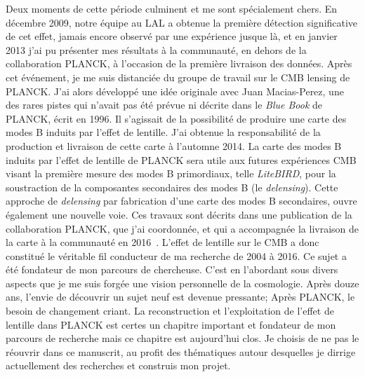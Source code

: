 \documentclass[a4paper, 12pt]{report}
\begin{document}
Deux moments de cette période culminent et me sont spécialement
chers. En décembre 2009, notre équipe au LAL a obtenue la première
détection significative de cet effet, jamais encore observé par une
expérience jusque là, et en janvier 2013 j'ai pu présenter mes
résultats à la communauté, en dehors de la collaboration PLANCK, à
l'occasion de la première livraison des
données. Après cet événement, je me suis distanciée du groupe de
travail sur le CMB lensing de PLANCK. J'ai alors développé une idée
originale avec Juan Macias-Perez, une des
rares pistes qui n'avait pas été prévue ni décrite dans le
\emph{Blue Book} de PLANCK, écrit en 1996. Il s'agissait de la
possibilité de produire une carte des modes B induits par l'effet de
lentille. J'ai obtenue la responsabilité de la production et livraison
de cette carte à l'automne 2014. La carte des modes B induits par
l'effet de lentille de PLANCK sera utile aux futures expériences CMB
visant la première mesure des modes B primordiaux, telle \emph{
  LiteBIRD}, pour la soustraction de la composantes secondaires des
modes B (le \emph{delensing}). Cette approche de \emph{delensing}
par fabrication d'une carte des modes B secondaires, ouvre également
une nouvelle voie. Ces travaux sont décrits dans une publication de la
collaboration PLANCK, que j'ai coordonnée, et
qui a accompagnée la livraison de la carte à la communauté en
2016~\citep{Planck2016_Bmap}.
L'effet de lentille sur le CMB a donc constitué le véritable fil
conducteur de ma recherche de 2004 à 2016.
Ce sujet a été fondateur de mon parcours de chercheuse. C'est en
l'abordant sous divers aspects que je me suis forgée une vision
personnelle de la cosmologie. Après douze ans, l'envie de découvrir un
sujet neuf est devenue pressante; Après PLANCK, le besoin de
changement criant. La reconstruction et l'exploitation de l'effet de
lentille dans PLANCK est certes un chapitre important et fondateur de
mon parcours de recherche mais ce chapitre est aujourd'hui clos. Je
choisis de ne pas le réouvrir dans ce manuscrit, au profit des
thématiques autour desquelles je dirrige actuellement des recherches et
construis mon projet.
\end{document}
